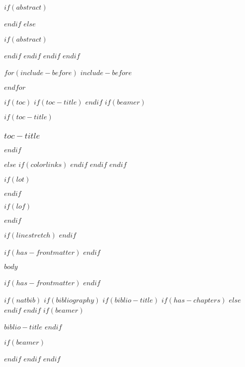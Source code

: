 \documentclass[
    $if(fontsize)$
      $fontsize$,
    $endif$
    $if(lang)$
      $babel-lang$,
    $endif$
    $if(papersize)$
      $papersize$paper,
    $endif$
    $if(beamer)$
        ignorenonframetext,
        $if(handout)$
          handout,
        $endif$
        $if(aspectratio)$
          aspectratio=$aspectratio$,
        $endif$
    $endif$
    $for(classoption)$
      $classoption$$sep$,
    $endfor$
]{$documentclass$}
\newif\ifbibliography
\begin{document}
            $if(abstract)$
                \begin{abstract}
                $abstract$
                \end{abstract}
            $endif$
        $else$
            \maketitle
            $if(abstract)$
                \begin{abstract}
                $abstract$
                \end{abstract}
            $endif$
        $endif$
    $endif$
$endif$

$for(include-before)$
$include-before$

$endfor$

$if(toc)$
    $if(toc-title)$
        \renewcommand*\contentsname{$toc-title$}
    $endif$
    $if(beamer)$
        \begin{frame}[allowframebreaks]
            $if(toc-title)$
              \frametitle{$toc-title$}
            $endif$
            \tableofcontents[hideallsubsections]
        \end{frame}
    $else$
        {
        $if(colorlinks)$
        \hypersetup{linkcolor=$if(toccolor)$$toccolor$$else$$endif$}
        $endif$
        \setcounter{tocdepth}{$toc-depth$}
        \tableofcontents
        }
    $endif$
$endif$

$if(lot)$
\listoftables
$endif$

$if(lof)$
\listoffigures
$endif$

$if(linestretch)$
$endif$

$if(has-frontmatter)$
\mainmatter
$endif$

$body$

$if(has-frontmatter)$
\backmatter
$endif$

$if(natbib)$
    $if(bibliography)$
        $if(biblio-title)$
            $if(has-chapters)$
            \renewcommand\bibname{$biblio-title$}
            $else$
            \renewcommand\refname{$biblio-title$}
            $endif$
        $endif$
        $if(beamer)$
        \begin{frame}[allowframebreaks]{$biblio-title$}
          \bibliographytrue
        $endif$
        
        $if(beamer)$
        \end{frame}
        $endif$
    $endif$
$endif$
\end{document}
